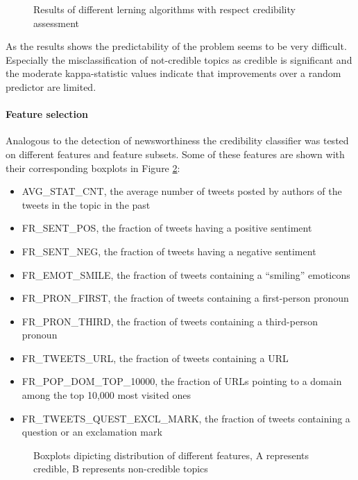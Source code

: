 \documentclass{proseminar}
\begin{document}
\begin{figure}[h]
\centering
{}
\caption{Results of different lerning algorithms with respect credibility assessment}
\label{fig:schemeCredibility}
\end{figure}

As the results shows the predictability of the problem seems to be very difficult. Especially the misclassification of not-credible topics as credible is significant and the moderate kappa-statistic values indicate that improvements over a random predictor are limited.

\paragraph{Feature selection}
Analogous to the detection of newsworthiness the credibility classifier was tested on different features and feature subsets. Some of these features are shown with their corresponding boxplots in Figure \ref{fig:boxCredibility}:

\begin{itemize}
\item AVG\_STAT\_CNT, the average number of tweets posted by authors of the tweets in the topic in the past
\item FR\_SENT\_POS, the fraction of tweets having a positive sentiment
\item FR\_SENT\_NEG, the fraction of tweets having a negative sentiment
\item FR\_EMOT\_SMILE, the fraction of tweets containing a “smiling” emoticons
\item FR\_PRON\_FIRST, the fraction of tweets containing a first-person pronoun
\item FR\_PRON\_THIRD, the fraction of tweets containing a third-person pronoun
\item FR\_TWEETS\_URL, the fraction of tweets containing a URL
\item FR\_POP\_DOM\_TOP\_10000, the fraction of URLs pointing to a domain among the top 10,000 most visited ones
\item FR\_TWEETS\_QUEST\_EXCL\_MARK, the fraction of tweets containing a question or an exclamation mark
\end{itemize}


\begin{figure}[h]
\centering
{}
\caption{Boxplots dipicting distribution of different features, A represents credible, B represents non-credible topics}
\label{fig:boxCredibility}
\end{figure}
\end{document}
